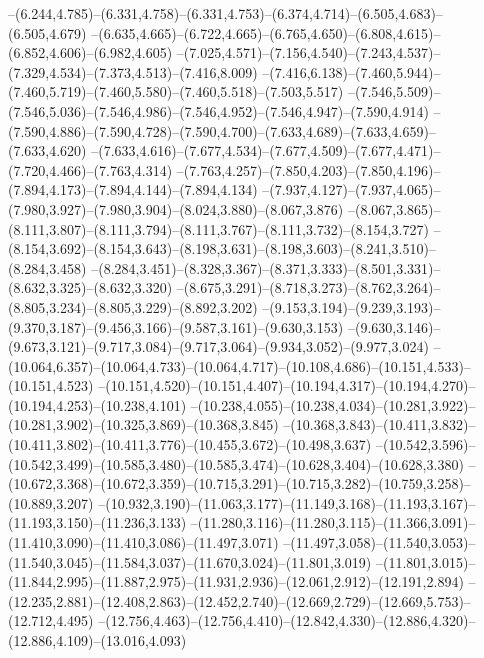   --(6.244,4.785)--(6.331,4.758)--(6.331,4.753)--(6.374,4.714)--(6.505,4.683)--(6.505,4.679)%
  --(6.635,4.665)--(6.722,4.665)--(6.765,4.650)--(6.808,4.615)--(6.852,4.606)--(6.982,4.605)%
  --(7.025,4.571)--(7.156,4.540)--(7.243,4.537)--(7.329,4.534)--(7.373,4.513)--(7.416,8.009)%
  --(7.416,6.138)--(7.460,5.944)--(7.460,5.719)--(7.460,5.580)--(7.460,5.518)--(7.503,5.517)%
  --(7.546,5.509)--(7.546,5.036)--(7.546,4.986)--(7.546,4.952)--(7.546,4.947)--(7.590,4.914)%
  --(7.590,4.886)--(7.590,4.728)--(7.590,4.700)--(7.633,4.689)--(7.633,4.659)--(7.633,4.620)%
  --(7.633,4.616)--(7.677,4.534)--(7.677,4.509)--(7.677,4.471)--(7.720,4.466)--(7.763,4.314)%
  --(7.763,4.257)--(7.850,4.203)--(7.850,4.196)--(7.894,4.173)--(7.894,4.144)--(7.894,4.134)%
  --(7.937,4.127)--(7.937,4.065)--(7.980,3.927)--(7.980,3.904)--(8.024,3.880)--(8.067,3.876)%
  --(8.067,3.865)--(8.111,3.807)--(8.111,3.794)--(8.111,3.767)--(8.111,3.732)--(8.154,3.727)%
  --(8.154,3.692)--(8.154,3.643)--(8.198,3.631)--(8.198,3.603)--(8.241,3.510)--(8.284,3.458)%
  --(8.284,3.451)--(8.328,3.367)--(8.371,3.333)--(8.501,3.331)--(8.632,3.325)--(8.632,3.320)%
  --(8.675,3.291)--(8.718,3.273)--(8.762,3.264)--(8.805,3.234)--(8.805,3.229)--(8.892,3.202)%
  --(9.153,3.194)--(9.239,3.193)--(9.370,3.187)--(9.456,3.166)--(9.587,3.161)--(9.630,3.153)%
  --(9.630,3.146)--(9.673,3.121)--(9.717,3.084)--(9.717,3.064)--(9.934,3.052)--(9.977,3.024)%
  --(10.064,6.357)--(10.064,4.733)--(10.064,4.717)--(10.108,4.686)--(10.151,4.533)--(10.151,4.523)%
  --(10.151,4.520)--(10.151,4.407)--(10.194,4.317)--(10.194,4.270)--(10.194,4.253)--(10.238,4.101)%
  --(10.238,4.055)--(10.238,4.034)--(10.281,3.922)--(10.281,3.902)--(10.325,3.869)--(10.368,3.845)%
  --(10.368,3.843)--(10.411,3.832)--(10.411,3.802)--(10.411,3.776)--(10.455,3.672)--(10.498,3.637)%
  --(10.542,3.596)--(10.542,3.499)--(10.585,3.480)--(10.585,3.474)--(10.628,3.404)--(10.628,3.380)%
  --(10.672,3.368)--(10.672,3.359)--(10.715,3.291)--(10.715,3.282)--(10.759,3.258)--(10.889,3.207)%
  --(10.932,3.190)--(11.063,3.177)--(11.149,3.168)--(11.193,3.167)--(11.193,3.150)--(11.236,3.133)%
  --(11.280,3.116)--(11.280,3.115)--(11.366,3.091)--(11.410,3.090)--(11.410,3.086)--(11.497,3.071)%
  --(11.497,3.058)--(11.540,3.053)--(11.540,3.045)--(11.584,3.037)--(11.670,3.024)--(11.801,3.019)%
  --(11.801,3.015)--(11.844,2.995)--(11.887,2.975)--(11.931,2.936)--(12.061,2.912)--(12.191,2.894)%
  --(12.235,2.881)--(12.408,2.863)--(12.452,2.740)--(12.669,2.729)--(12.669,5.753)--(12.712,4.495)%
  --(12.756,4.463)--(12.756,4.410)--(12.842,4.330)--(12.886,4.320)--(12.886,4.109)--(13.016,4.093)%

